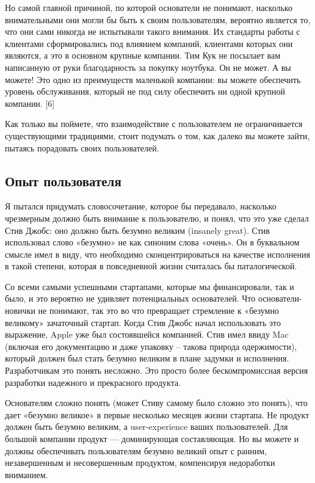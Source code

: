 \documentclass[ebook,12pt,oneside,openany]{memoir}
\begin{document}
Но самой главной причиной, по которой основатели не понимают,
насколько внимательными они могли бы быть к своим пользователям,
вероятно является то, что они сами никогда не испытывали такого
внимания. Их стандарты работы с клиентами сформировались под влиянием
компаний, клиентами которых они являются, а это в основном крупные
компании. Тим Кук не посылает вам написанную от руки благодарность за
покупку ноутбука. Он не может. А вы можете! Это одно из преимуществ
маленькой компании: вы можете обеспечить уровень обслуживания, который
не под силу обеспечить ни одной крупной компании. [6] \newline

Как только вы поймете, что взаимодействие с пользователем не
ограничивается существующими традициями, стоит подумать о том, как
далеко вы можете зайти, пытаясь порадовать своих пользователей.
\newline

\subsection{Опыт пользователя}

Я пытался придумать словосочетание, которое бы передавало, насколько
чрезмерным должно быть внимание к пользователю, и понял, что это уже
сделал Стив Джобс: оно должно быть безумно великим (insanely great).
Стив использовал слово «безумно» не как синоним слова «очень». Он в
буквальном смысле имел в виду, что необходимо сконцентрироваться на
качестве исполнения в такой степени, которая в повседневной жизни
считалась бы паталогической. \newline

Со всеми самыми успешными стартапами, которые мы финансировали, так и
было, и это вероятно не удивляет потенциальных основателей. Что
основатели-новички не понимают, так это во что превращает стремление к
«безумно великому» зачаточный стартап. Когда Стив Джобс начал
использовать это выражение, Apple уже был состоявшейся компанией. Стив
имел ввиду Mac (включая его документацию и даже упаковку – такова
природа одержимости), который должен был стать безумно великим в плане
задумки и исполнения. Разработчикам это понять несложно. Это просто
более бескомпромиссная версия разработки надежного и прекрасного
продукта. \newline

Основателям сложно понять (может Стиву самому было сложно это понять),
что дает «безумно великое» в первые несколько месяцев жизни стартапа.
Не продукт должен быть безумно великим, а user-experience ваших
пользователей. Для большой компании продукт — доминирующая
составляющая. Но вы можете и должны обеспечивать пользователям безумно
великий опыт с ранним, незавершенным и несовершенным продуктом,
компенсируя недоработки вниманием. \newline
\end{document}
